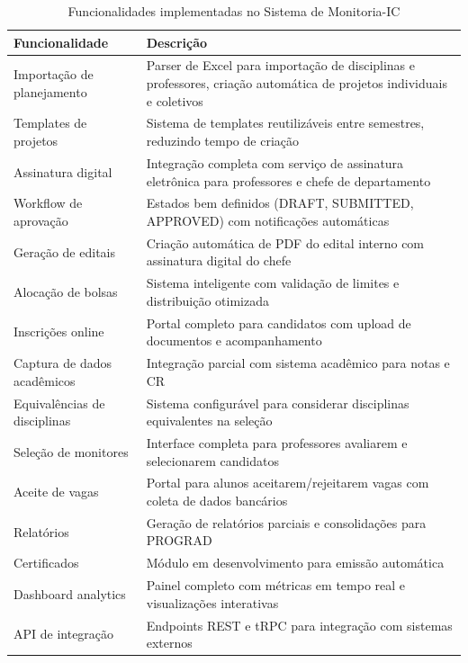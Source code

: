 \documentclass[portuguese]{sbc2025}%
\begin{document}
\begin{table}[htb]
  \centering
  \caption{Funcionalidades implementadas no Sistema de Monitoria-IC}
  \label{tab:funcionalidades}
  \begin{tabular}{|l|p{9cm}|}
    \hline
    \textbf{Funcionalidade} & \textbf{Descrição} \\
    \hline
    Importação de planejamento & Parser de Excel para importação de disciplinas e professores, criação automática de projetos individuais e coletivos \\
    \hline
    Templates de projetos & Sistema de templates reutilizáveis entre semestres, reduzindo tempo de criação \\
    \hline
    Assinatura digital & Integração completa com serviço de assinatura eletrônica para professores e chefe de departamento \\
    \hline
    Workflow de aprovação & Estados bem definidos (DRAFT, SUBMITTED, APPROVED) com notificações automáticas \\
    \hline
    Geração de editais & Criação automática de PDF do edital interno com assinatura digital do chefe \\
    \hline
    Alocação de bolsas & Sistema inteligente com validação de limites e distribuição otimizada \\
    \hline
    Inscrições online & Portal completo para candidatos com upload de documentos e acompanhamento \\
    \hline
    Captura de dados acadêmicos & Integração parcial com sistema acadêmico para notas e CR \\
    \hline
    Equivalências de disciplinas & Sistema configurável para considerar disciplinas equivalentes na seleção \\
    \hline
    Seleção de monitores & Interface completa para professores avaliarem e selecionarem candidatos \\
    \hline
    Aceite de vagas & Portal para alunos aceitarem/rejeitarem vagas com coleta de dados bancários \\
    \hline
    Relatórios & Geração de relatórios parciais e consolidações para PROGRAD \\
    \hline
    Certificados & Módulo em desenvolvimento para emissão automática \\
    \hline
    Dashboard analytics & Painel completo com métricas em tempo real e visualizações interativas \\
    \hline
    API de integração & Endpoints REST e tRPC para integração com sistemas externos \\
    \hline
  \end{tabular}
\end{table}
\end{document}

